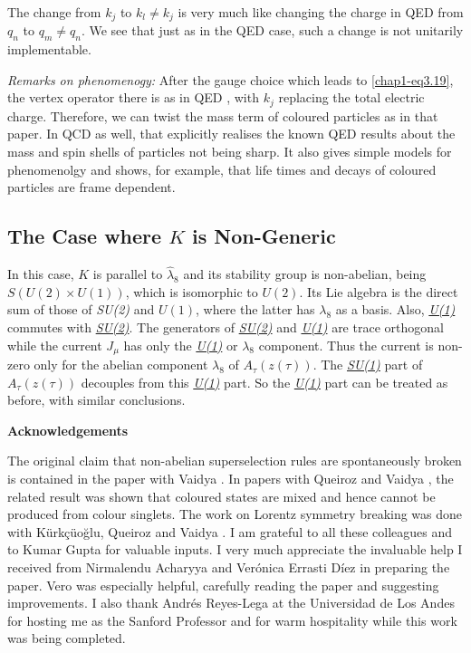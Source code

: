 The change from $k_j$ to $k_l \neq k_j$ is very much like changing the charge in QED from $q_n$ to $q_m \neq q_n$. We see that just as in the QED case, such a change is not unitarily implementable.

\textit{Remarks on phenomenogy:} After the gauge choice which leads to \eqref{chap1-eq3.19}, the vertex operator there is as in QED \cite{key4}, with $k_j$ replacing the total electric charge. Therefore, we can twist the mass term of coloured particles as in that paper. In QCD as well, that explicitly realises the known QED results \cite{key2, key3} about the mass and spin shells of particles not being sharp. It also gives simple models for phenomenolgy and shows, for example, that life times and decays of coloured particles are frame dependent.

\vspace{-.2cm}

\subsection{The Case where $K$ is Non-Generic}\label{chap1-sec4.1}

\vspace{-.15cm}

In this case, $K$ is parallel to $\hat{\lambda}_8$ and its stability group is non-abelian, being $S(U(2) \times U(1))$, which is isomorphic to $U(2)$. Its Lie algebra is the direct sum of those of \textit{SU(2)} and $U(1)$, where the latter has $\lambda_8$ as a basis. Also, \ul{\textit{U(1)}} commutes with \ul{\textit{SU(2)}}. The generators of \ul{\textit{SU(2)}} and \ul{\textit{U(1)}} are trace orthogonal while the current $J_\mu$ has only the \ul{\textit{U(1)}} or $\lambda_8$ component. Thus the current is non-zero only for the abelian component $\lambda_8$ of $A_\tau(z (\tau))$. The \ul{\textit{SU(1)}} part of $A_\tau (z(\tau))$ decouples from this \ul{\textit{U(1)}} part. So the \ul{\textit{U(1)}} part can be treated as before, with similar conclusions.

\medskip
\noindent \textbf{\large Acknowledgements}

\medskip

The original claim that non-abelian superselection rules are spontaneously broken is contained in the paper with Vaidya \cite{key1}. In papers with Queiroz and Vaidya \cite{key10, key13}, the related result was shown that coloured states are mixed and hence cannot be produced from colour singlets. The work on Lorentz symmetry breaking was done with K\"urk\c{c}\"{u}o\u{g}lu, Queiroz and Vaidya \cite{key4}. I am grateful to all these colleagues and to Kumar Gupta for valuable inputs. I very much appreciate the invaluable help I received from Nirmalendu Acharyya and Ver\'onica Errasti D\'iez in preparing the paper. Vero was especially helpful, carefully reading the paper and suggesting improvements. I also thank Andr\'es Reyes-Lega at the Universidad de Los Andes for hosting me as the Sanford Professor and for warm hospitality while this work was being completed.

